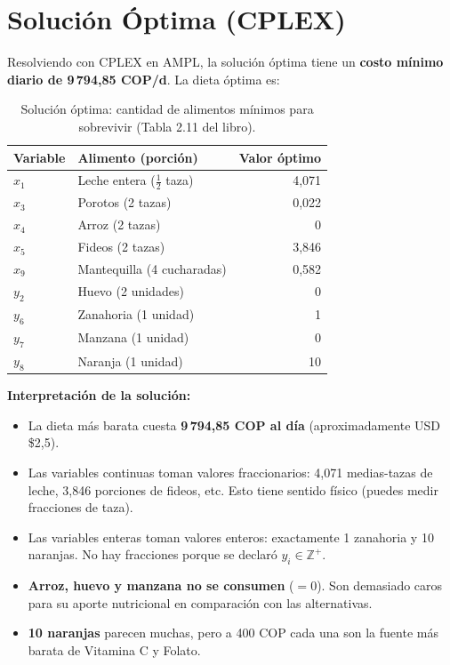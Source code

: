 \documentclass[12pt]{article}
\begin{document}
\section{Soluci\'on \'Optima (CPLEX)}

Resolviendo con CPLEX en AMPL, la soluci\'on \'optima tiene un \textbf{costo m\'inimo diario de 9\,794,85 COP/d}. La dieta \'optima es:

\begin{table}[h]
\centering
\begin{tabular}{llr}
\toprule
\textbf{Variable} & \textbf{Alimento (porci\'on)} & \textbf{Valor \'optimo} \\
\midrule
$x_1$ & Leche entera ($\frac{1}{2}$ taza) & 4,071 \\
$x_3$ & Porotos (2 tazas) & 0,022 \\
$x_4$ & Arroz (2 tazas) & 0 \\
$x_5$ & Fideos (2 tazas) & 3,846 \\
$x_9$ & Mantequilla (4 cucharadas) & 0,582 \\
\midrule
$y_2$ & Huevo (2 unidades) & 0 \\
$y_6$ & Zanahoria (1 unidad) & 1 \\
$y_7$ & Manzana (1 unidad) & 0 \\
$y_8$ & Naranja (1 unidad) & 10 \\
\bottomrule
\end{tabular}
\caption{Soluci\'on \'optima: cantidad de alimentos m\'inimos para sobrevivir (Tabla 2.11 del libro).}
\end{table}

\begin{cajaverde}
\textbf{Interpretaci\'on de la soluci\'on:}
\begin{itemize}
    \item La dieta m\'as barata cuesta \textbf{9\,794,85 COP al d\'ia} (aproximadamente USD \$2,5).
    \item Las variables continuas toman valores fraccionarios: 4,071 medias-tazas de leche, 3,846 porciones de fideos, etc. Esto tiene sentido f\'isico (puedes medir fracciones de taza).
    \item Las variables enteras toman valores enteros: exactamente 1 zanahoria y 10 naranjas. No hay fracciones porque se declar\'o $y_i \in \mathbb{Z}^+$.
    \item \textbf{Arroz, huevo y manzana no se consumen} ($= 0$). Son demasiado caros para su aporte nutricional en comparaci\'on con las alternativas.
    \item \textbf{10 naranjas} parecen muchas, pero a 400 COP cada una son la fuente m\'as barata de Vitamina C y Folato.
\end{itemize}
\end{cajaverde}
\end{document}
